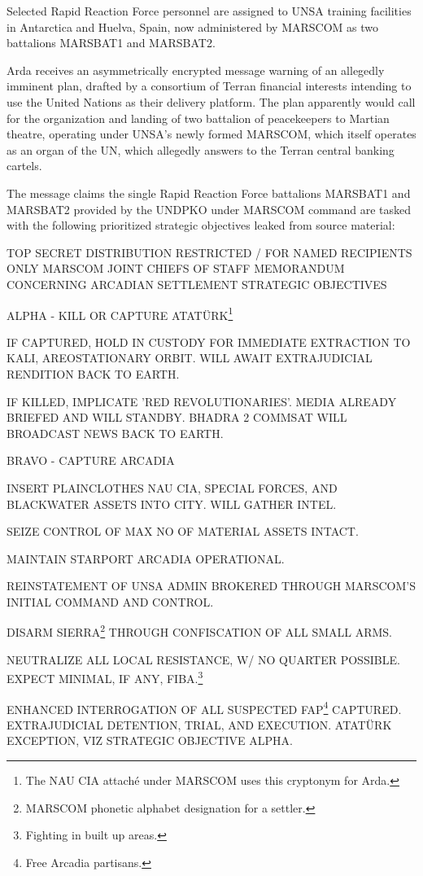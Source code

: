 Selected Rapid Reaction Force personnel are assigned to UNSA training facilities in Antarctica and Huelva, Spain, now administered by MARSCOM as two battalions MARSBAT1 and MARSBAT2.
\StopTimelineDate

Arda receives an asymmetrically encrypted message warning of an allegedly imminent plan, drafted by a consortium of Terran financial interests intending to use the United Nations as their delivery platform. The plan apparently would call for the organization and landing of two battalion of peacekeepers to Martian theatre, operating under UNSA's newly formed MARSCOM, which itself operates as an organ of the UN, which allegedly answers to the Terran central banking cartels.

The message claims the single Rapid Reaction Force battalions MARSBAT1 and MARSBAT2 provided by the UNDPKO under MARSCOM command are tasked with the following prioritized strategic objectives leaked from source material:

\startTimelineCorrespondenceDocument
TOP SECRET
DISTRIBUTION RESTRICTED / FOR NAMED RECIPIENTS ONLY
MARSCOM JOINT CHIEFS OF STAFF
{ MEMORANDUM CONCERNING ARCADIAN SETTLEMENT STRATEGIC OBJECTIVES}
\startitemize[4]
\item { ALPHA} - KILL OR CAPTURE ATATÜRK\footnote{The NAU CIA attaché under MARSCOM uses this cryptonym for Arda.}

    \startitemize[n]
    \item IF CAPTURED, HOLD IN CUSTODY FOR IMMEDIATE EXTRACTION TO KALI, AREOSTATIONARY ORBIT. WILL AWAIT EXTRAJUDICIAL RENDITION BACK TO EARTH.
    \item IF KILLED, IMPLICATE 'RED REVOLUTIONARIES'. MEDIA ALREADY BRIEFED AND WILL STANDBY. BHADRA 2 COMMSAT WILL BROADCAST NEWS BACK TO EARTH.
    \stopitemize

\item { BRAVO} - CAPTURE ARCADIA
    \startitemize[n]
    \item INSERT PLAINCLOTHES NAU CIA, SPECIAL FORCES, AND BLACKWATER ASSETS INTO CITY. WILL GATHER INTEL.
    \item SEIZE CONTROL OF MAX NO OF MATERIAL ASSETS INTACT.
    \item MAINTAIN STARPORT ARCADIA OPERATIONAL.
    \item REINSTATEMENT OF UNSA ADMIN BROKERED THROUGH MARSCOM'S INITIAL COMMAND AND CONTROL.
    \item DISARM SIERRA\footnote{MARSCOM phonetic alphabet designation for a settler.} THROUGH CONFISCATION OF ALL SMALL ARMS.
    \item NEUTRALIZE ALL LOCAL RESISTANCE, W/ NO QUARTER POSSIBLE. EXPECT MINIMAL, IF ANY, FIBA.\footnote{Fighting in built up areas.} 
    \item ENHANCED INTERROGATION OF ALL SUSPECTED FAP\footnote{Free Arcadia partisans.} CAPTURED. EXTRAJUDICIAL DETENTION, TRIAL, AND EXECUTION. ATATÜRK EXCEPTION, VIZ STRATEGIC OBJECTIVE ALPHA.
    \stopitemize

